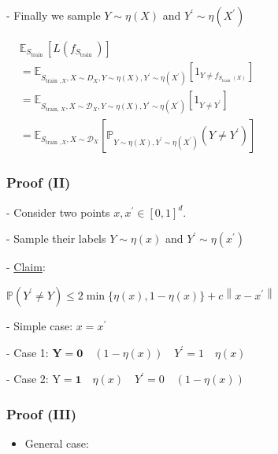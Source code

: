 - Finally we sample $Y \sim \eta(X)$ and $Y^{\prime} \sim \eta\left(X^{\prime}\right)$

$
\begin{aligned}
& \mathbb{E}_{S_{\text {train }}}\left[L\left(f_{S_{\text {train }}}\right)\right]\\
& =\mathbb{E}_{S_{\text {train }, X}, X \sim D_{X}, Y \sim \eta(X), Y^{\prime} \sim \eta\left(X^{\prime}\right)}\left[1_{Y \neq f_{S_{\text {train }}(X)}}\right] \\
& =\mathbb{E}_{S_{\text {train, } X}, X \sim \mathscr{D}_{X}, Y \sim \eta(X), Y^{\prime} \sim \eta\left(X^{\prime}\right)}\left[1_{Y \neq Y^{\prime}}\right] \\
& =\mathbb{E}_{S_{\text {train }, X}, X \sim \mathscr{D}_{X}}\left[\mathbb{P}_{Y \sim \eta(X), Y^{\prime} \sim \eta\left(X^{\prime}\right)}\left(Y \neq Y^{\prime}\right)\right]
\end{aligned}
$

\subsubsection*{Proof (II)}
- Consider two points $x, x^{\prime} \in[0,1]^{d}$.

- Sample their labels $Y \sim \eta(x)$ and $Y^{\prime} \sim \eta\left(x^{\prime}\right)$

- \underline{Claim}:

$
\mathbb{P}\left(Y^{\prime} \neq Y\right) \leq 2 \min \{\eta(x), 1-\eta(x)\}+c\left\|x-x^{\prime}\right\|
$

- Simple case: $x=x^{\prime}$


- Case 1:
$\mathbf{Y}=\mathbf{0} \quad (1-\eta(x)) \quad Y^{\prime}=1 \quad \eta(x)$

- Case 2:
$\mathrm{Y}=\mathbf{1} \quad \eta(x) \quad Y^{\prime}=0 \quad(1-\eta(x))$

\subsubsection*{Proof (III)}
\begin{itemize}
  \item General case:
\end{itemize}

